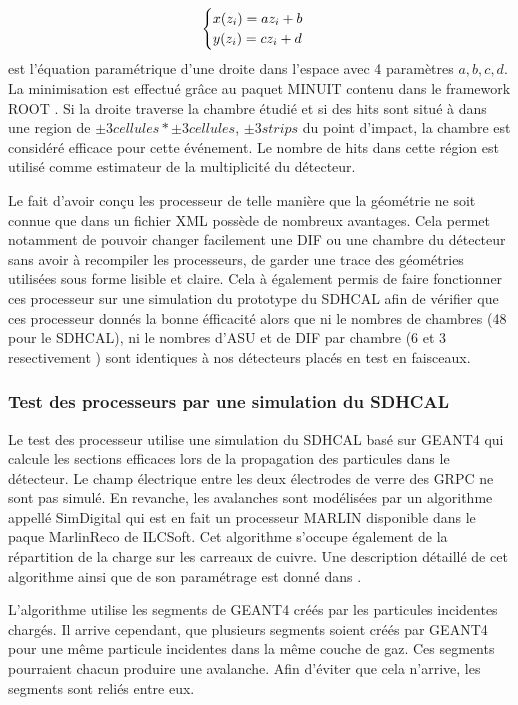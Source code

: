 \begin{itemize}[label=$\bullet$]
\begin{equation}
\begin{cases}
\strut x(z_i)=az_i+b\\
y(z_i)=cz_i+d
\end{cases}
\end{equation}
est l'équation paramétrique d'une droite dans l'espace avec 4 paramètres $a,b,c,d$. La minimisation est effectué grâce au paquet MINUIT \cite{James:2004xla} contenu dans le framework ROOT \cite{BRUN199781}.
Si la droite traverse la chambre étudié et si des hits sont situé à dans une region de $\pm 3 cellules*\pm 3 cellules$, $\pm 3 strips$ du point d'impact, la chambre est considéré efficace pour cette événement. Le nombre de hits dans cette région est utilisé comme estimateur de la multiplicité du détecteur.
\end{itemize}

Le fait d'avoir conçu les processeur de telle manière que la géométrie ne soit connue que dans un fichier XML possède de nombreux avantages. Cela permet notamment de pouvoir changer facilement une DIF ou une chambre du détecteur sans avoir à recompiler les processeurs, de garder une trace des géométries utilisées sous forme lisible et claire. Cela à également permis de faire fonctionner ces processeur sur une simulation du prototype du SDHCAL afin de vérifier que ces processeur donnés la bonne éfficacité alors que ni le nombres de chambres (48 pour le SDHCAL), ni le nombres d'ASU et de DIF par chambre (6 et 3 resectivement ) sont identiques à nos détecteurs placés en test en faisceaux.

\subsubsection{Test des processeurs par une simulation du SDHCAL}
Le test des processeur utilise une simulation du SDHCAL basé sur GEANT4\cite{AGOSTINELLI2003250} qui calcule les sections efficaces lors de la propagation des particules dans le détecteur. Le champ électrique entre les deux électrodes de verre des GRPC ne sont pas simulé. En revanche, les avalanches sont modélisées par un algorithme appellé SimDigital qui est en fait un processeur MARLIN disponible dans le paque MarlinReco \cite{2007Prama} de ILCSoft. Cet algorithme s'occupe également de la répartition de la charge sur les carreaux de cuivre. Une description détaillé de cet algorithme ainsi que de son paramétrage est donné dans \cite{steen:tel-01282680}.

L'algorithme utilise les segments de GEANT4 créés par les particules incidentes chargés. Il arrive cependant, que plusieurs segments soient créés par GEANT4 pour une même particule incidentes dans la même couche de gaz. Ces segments pourraient chacun produire une avalanche. Afin d'éviter que cela n'arrive, les segments sont reliés entre eux.


